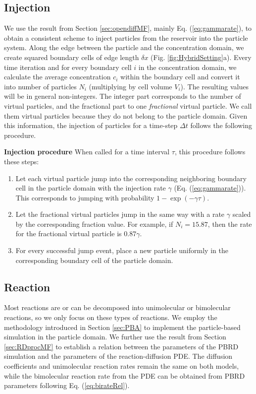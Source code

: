 \documentclass[10pt,twocolumn]{revtex4-1}
\begin{document}
	\subsection{Injection}
	We use the result from Section \ref{sec:opendiffMF}, mainly Eq. (\ref{eq:gammarate}), to obtain a consistent scheme to inject particles from the reservoir into the particle system. Along the edge between the particle and the concentration domain, we create squared boundary cells of edge length $\delta x$ (Fig. \ref{fig:HybridSetting}a). Every time iteration and for every boundary cell $i$ in the concentration domain, we calculate the average concentration $c_i$ within the boundary cell and convert it into number of particles $N_i$ (multiplying by cell volume $V_i$). The resulting values will be in general non-integers. The integer part corresponds to the number of virtual particles, and the fractional part to one \textit{fractional} virtual particle. We call them virtual particles because they do not belong to the particle domain. Given this information, the injection of particles for a time-step $\Delta t$ follows the following procedure.
	
	\textbf{Injection procedure}
	When called for a time interval $\tau$, this procedure follows these steps:
	\begin{enumerate}
		\item Let each virtual particle jump into the corresponding neighboring boundary cell in the particle domain with the injection rate $\gamma$ (Eq. (\ref{eq:gammarate})). This corresponds to jumping with probability $1-\exp (-\gamma \tau)$.
		\item Let the fractional virtual particles jump in the same way with a rate $\gamma$ scaled by the corresponding fraction value. For example, if $N_i=15.87$, then the rate for the fractional virtual particle is $0.87\gamma$.
		\item For every successful jump event, place a new particle uniformly in the corresponding boundary cell of the particle domain.   
	\end{enumerate}
	
	\subsection{Reaction}
	Most reactions are or can be decomposed into unimolecular or bimolecular reactions, so we only focus on these types of reactions. We employ the methodology introduced in Section \ref{sec:PBA} to implement the particle-based simulation in the particle domain. We further use the result from Section \ref{sec:RDprocMF} to establish a relation between the parameters of the PBRD simulation and the parameters of the reaction-diffusion PDE. The diffusion coefficients and unimolecular reaction rates remain the same on both models, while the bimolecular reaction rate from the PDE can be obtained from PBRD parameters following Eq. (\ref{eq:birateRel}). 
	
\end{document}
